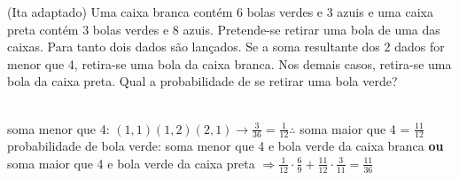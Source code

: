 \begin{ex}
(Ita adaptado) Uma caixa branca contém 6 bolas verdes e 3 azuis e uma caixa preta contém 3 bolas verdes e 8 azuis. Pretende-se retirar uma bola de uma das caixas. Para tanto dois dados são lançados. Se a soma resultante dos 2 dados for menor que 4, retira-se uma bola da caixa branca. Nos demais casos, retira-se uma bola da caixa preta. Qual a probabilidade de se retirar uma bola verde?
  \begin{sol}
   \phantom{A}  \\
   soma menor que 4: $(1,1) (1,2) (2,1) \rightarrow \frac{3}{36}=\frac{1}{12} \therefore$ soma maior que 4 = $\frac{11}{12}$\\
   probabilidade de bola verde: soma menor que 4 e bola verde da caixa branca \textbf{ou} soma maior que 4 e bola verde da caixa preta $\Longrightarrow \frac{1}{12}\cdot\frac{6}{9} + \frac{11}{12}\cdot\frac{3}{11}=\frac{11}{36}$ 
   
  \end{sol}
\end{ex}